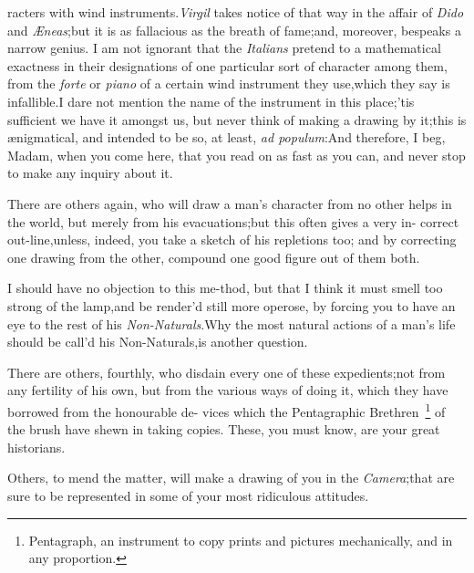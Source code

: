 \documentclass{article}
\begin{document}
\noindent
{}
racters with wind instruments.\tsk  \textit{Virgil} takes notice
of that way in the affair of \textit{Dido} and
\textit{Æneas};\tsk  but it is as fallacious as the breath of
fame;\tsk  and, moreover, bespeaks a narrow genius. I am not
ignorant that the \textit{Italians} pretend to a mathematical
exactness in their designations of one particular sort of
character among them, from the \textit{forte} or \textit{piano}
of a certain wind instrument they use,\tsk  which they say is
infallible.\tsk  I dare not mention the name of the instrument
in this place;\tsk  ’tis sufficient we have it amongst us,\tsk
but never think of making a drawing by it;\tsk  this is
ænigmatical, and intended to be so, at least, \textit{ad
populum}:\tsk  And therefore, I beg, Madam, when you come here,
that you read on as fast as you can, and never stop to make any
inquiry about it.

There are others again, who will draw a man’s character
from no other helps in the world, but merely from his
evacuations;\tsk  but this often gives a very in-
correct out-line,\tsk  unless, indeed, you\break
take a sketch of his repletions too; and\break
by correcting one drawing from the\break
other, compound one good figure out of\break
them both.

I should have no objection to this me-\break thod, but that I think it
must smell too strong of the lamp,\tsk  and be render’d
still more operose, by forcing you to have an eye to the rest of
his \textit{Non-Naturals}.\tsk\break  Why the most natural actions of a
man’s life should be call’d his Non-Naturals,\tsk\break  is
another question.

There are others, fourthly, who disdain every one of these expedients;\tsk  not from
any fertility of his own, but from the various ways of doing it, which they have
borrowed from the honourable de- vices which the Pentagraphic
Brethren~\footnote{\enspace Pentagraph, \vrule width 0pt height 16pt
an instrument to copy prints and pictures
mechanically, and in any proportion.} of the brush have shewn in
taking co\-pies.\tsk 
These, you must know, are your great historians.

\noindent
{}

Others, to mend the matter, will make a drawing of you in the
\textit{Camera};\tsk  that\break
{}
are sure to be represented in some of your most
ridiculous attitudes.
\end{document}
